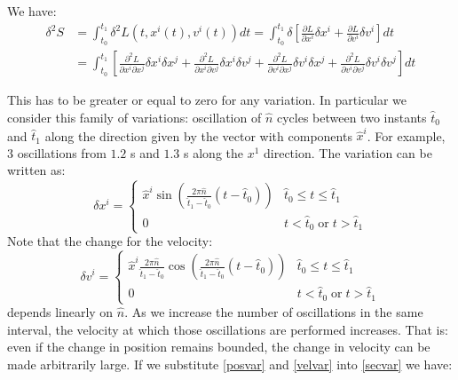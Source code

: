 \documentclass[aps,pra,10pt,floatfix,nofootinbib]{revtex4-1}
\theoremstyle{definition}
\begin{document}
We have:
\begin{align}
\delta^2 S &= \int_{t_0}^{t_1} \delta^2 L(t, x^i(t), v^i(t)) dt = \int_{t_0}^{t_1} \delta \left[\frac{\partial L}{\partial x^i} \delta x^i +  \frac{\partial L}{\partial v^i} \delta v^i \right]dt \nonumber \\
&= \int_{t_0}^{t_1} \left[ \frac{\partial^2 L}{\partial x^i\partial x^j} \delta x^i \delta x^j + \frac{\partial^2 L}{\partial x^i\partial v^j} \delta x^i \delta v^j \right. + \left. \frac{\partial^2 L}{\partial v^i\partial x^j} \delta v^i \delta x^j  + \frac{\partial^2 L}{\partial v^i\partial v^j} \delta v^i \delta v^j\right]dt
\label{secvar}
\end{align}

This has to be greater or equal to zero for any variation. In particular we consider this family of variations: oscillation of $\hat{n}$ cycles between two instants $\hat{t}_0$ and $\hat{t}_1$ along the direction given by the vector with components $\hat{x}^i$. For example, $3$ oscillations from $1.2$ s and $1.3$ s along the $x^1$ direction. The variation can be written as:
\begin{equation}
\label{posvar}
\delta x^i = \left\{
\begin{array}{ll}
\hat{x}^i \sin\left(\frac{2\pi \hat{n}}{\hat{t}_1 - \hat{t}_0} (t-\hat{t}_0)\right)  & \hat{t}_0 \leq t \leq \hat{t}_1 \\
0 & t < \hat{t}_0 \; \textrm{or} \; t > \hat{t}_1
\end{array}
\right.
\end{equation}
Note that the change for the velocity:
\begin{equation}
\label{velvar}
\delta v^i = \left\{
\begin{array}{ll}
\hat{x}^i \frac{2\pi \hat{n}}{\hat{t}_1 - \hat{t}_0} \cos\left(\frac{2\pi \hat{n}}{\hat{t}_1 - \hat{t}_0} (t-\hat{t}_0)\right)  & \hat{t}_0 \leq t \leq \hat{t}_1 \\
0 & t < \hat{t}_0 \; \textrm{or} \; t > \hat{t}_1
\end{array}
\right.
\end{equation}
depends linearly on $\hat{n}$. As we increase the number of oscillations in the same interval, the velocity at which those oscillations are performed increases. That is: even if the change in position remains bounded, the change in velocity can be made arbitrarily large.  If we substitute \eqref{posvar} and \eqref{velvar} into \eqref{secvar} we have:
\end{document}
